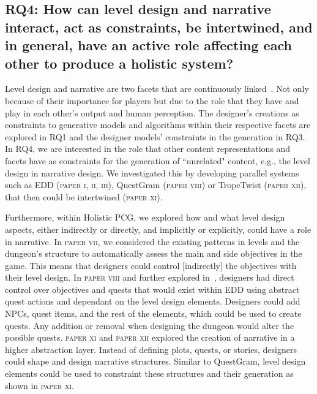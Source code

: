 \subsection[Research Question 4]{RQ4: How can level design and narrative interact, act as constraints, be intertwined, and in general, have an active role affecting each other to produce a holistic system?  }


Level design and narrative are two facets that are continuously linked~\cite{kishino_hunt_2005,ashmore_quest_2007,kybartas_quinn_survey_2017}. Not only because of their importance for players but due to the role that they have and play in each other's output and human perception. The designer's creations as constraints to generative models and algorithms within their respective facets are explored in RQ1 and the designer models' constraints in the generation in RQ3. In RQ4, we are interested in the role that other content representations and facets have as constraints for the generation of ``unrelated" content, e.g., the level design in narrative design. We investigated this by developing parallel systems such as EDD (\textsc{paper i, ii, iii}), QuestGram (\textsc{paper viii}) or TropeTwist (\textsc{paper xii}), that then could be intertwined (\textsc{paper xi}). 

Furthermore, within Holistic PCG, we explored how and what level design aspects, either indirectly or directly, and implicitly or explicitly, could have a role in narrative. In \textsc{paper vii}, we considered the existing patterns in levels and the dungeon's structure to automatically assess the main and side objectives in the game. This means that designers could control [indirectly] the objectives with their level design. In \textsc{paper viii} and further explored in~\cite{larsson_queststories_2021}, designers had direct control over objectives and quests that would exist within EDD using abstract quest actions and dependant on the level design elements. Designers could add NPCs, quest items, and the rest of the elements, which could be used to create quests. Any addition or removal when designing the dungeon would alter the possible quests. \textsc{paper xi} and \textsc{paper xii} explored the creation of narrative in a higher abstraction layer. Instead of defining plots, quests, or stories, designers could shape and design narrative structures. Similar to QuestGram, level design elements could be used to constraint these structures and their generation as shown in \textsc{paper xi}.

